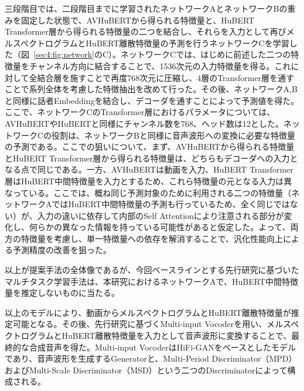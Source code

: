 \documentclass[12pt]{jarticle}
\numberwithin{equation}{section}    %
\numberwithin{figure}{section}      %
\numberwithin{table}{section}      %
\begin{document}
三段階目では、二段階目までに学習されたネットワークAとネットワークBの重みを固定した状態で、AVHuBERTから得られる特徴量と、HuBERT Transformer層から得られる特徴量の二つを結合し、それらを入力として再びメルスペクトログラムとHuBERT離散特徴量の予測を行うネットワークCを学習した（図~\ref{sec4:fig:network}のC）。ネットワークCでは、はじめに前述した二つの特徴量をチャンネル方向に結合することで、1536次元の入力特徴量を得る。これに対して全結合層を施すことで再度768次元に圧縮し、4層のTransformer層を通すことで系列全体を考慮した特徴抽出を改めて行った。その後、ネットワークA,Bと同様に話者Embeddingを結合し、デコーダを通すことによって予測値を得た。ここで、ネットワークCのTransformer層におけるパラメータについては、AVHuBERTやHuBERTと同様にチャンネル数を768、ヘッド数は12とした。ネットワークCの役割は、ネットワークBと同様に音声波形への変換に必要な特徴量の予測である。ここでの狙いについて、まず、AVHuBERTから得られる特徴量とHuBERT Transformer層から得られる特徴量は、どちらもデコーダへの入力となる点で同じである。一方、AVHuBERTは動画を入力、HuBERT Transformer層はHuBERT中間特徴量を入力とするため、これら特徴量の元となる入力は異なっている。ここでは、概ね同じ予測対象のために利用される二つの特徴量（ネットワークAではHuBERT中間特徴量の予測も行っているため、全く同じではない）が、入力の違いに依存して内部のSelf Attentionにより注意される部分が変化し、何らかの異なった情報を持っている可能性があると仮定した。よって、両方の特徴量を考慮し、単一特徴量への依存を解消することで、汎化性能向上による予測精度の改善を狙った。

以上が提案手法の全体像であるが、今回ベースラインとする先行研究\cite{choi2023intelligible}に基づいたマルチタスク学習手法は、本研究におけるネットワークAで、HuBERT中間特徴量を推定しないものに当たる。

以上のモデルにより、動画からメルスペクトログラムとHuBERT離散特徴量が推定可能となる。その後、先行研究\cite{choi2023intelligible}に基づくMulti-input Vocoderを用い、メルスペクトログラムとHuBERT離散特徴量を入力として音声波形に変換することで、最終的な合成音声を得た。Multi-input VocoderはHiFi-GAN\cite{kong2020hifi}をベースとしたモデルであり、音声波形を生成するGeneratorと、Multi-Period Discriminator（MPD）およびMulti-Scale Discriminator（MSD）という二つのDiscriminatorによって構成される。
\end{document}

